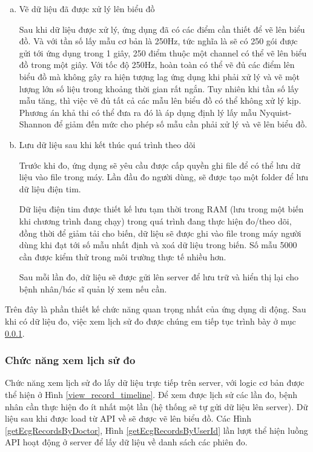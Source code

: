 \begin{enumerate} [a)]
  \item Vẽ dữ liệu đã được xử lý lên biểu đồ

    Sau khi dữ liệu được xử lý, ứng dụng đã có các điểm cần thiết để vẽ lên biểu đồ. Và với tần số lấy mẫu cơ bản là 250Hz, 
    tức nghĩa là sẽ có 250 gói được gửi tới ứng dụng trong 1 giây, 250 điểm thuộc một channel có thể vẽ lên biểu đồ trong một giây.
    Với tốc độ 250Hz, hoàn toàn có thể vẽ đủ các điểm lên biểu đồ mà không gây ra hiện tượng lag ứng dụng khi phải xử lý và vẽ một
    lượng lớn số liệu trong khoảng thời gian rất ngắn. Tuy nhiên khi tần số lấy mẫu tăng, thì việc vẽ đủ tất cả các mẫu lên
    biểu đồ có thể không xử lý kịp. Phương án khả thi có thể đưa ra đó là áp dụng định lý lấy mẫu Nyquist-Shannon để giảm
    đến mức cho phép số mẫu cần phải xử lý và vẽ lên biểu đồ.

  \item Lưu dữ liệu sau khi kết thúc quá trình theo dõi
    
    Trước khi đo, ứng dụng sẽ yêu cầu được cấp quyền ghi file để có thể lưu dữ liệu vào file trong máy. Lần đầu đo người dùng,
    sẽ được tạo một folder để lưu dữ liệu điện tim.
  
    Dữ liệu điện tim được thiết kế lưu tạm thời trong RAM (lưu trong một biến khi chương trình đang chạy) trong quá trình 
    đang thực hiện đo/theo dõi, đồng thời để giảm tải cho biến, dữ liệu sẽ được ghi vào file trong máy người dùng khi đạt tới số mẫu nhất định và xoá dữ liệu trong biến.
    Số mẫu 5000 cần được kiểm thử trong môi trường thực tế nhiều hơn.

    Sau mỗi lần đo, dữ liệu sẽ được gửi lên server để lưu trữ và hiển thị lại cho bệnh nhân/bác sĩ quản lý xem nếu cần.

\end{enumerate}
Trên đây là phần thiết kế chức năng quan trọng nhất của ứng dụng di động. Sau khi có dữ liệu đo, việc xem lịch sử đo được chúng em 
tiếp tục trình bày ở mục \ref{function_view_history_record}.

\subsubsection{Chức năng xem lịch sử đo}
\label{function_view_history_record}


Chức năng xem lịch sử đo lấy dữ liệu trực tiếp trên server, với logic cơ bản được thể hiện ở Hình \ref{view_record_timeline}. 
Để xem được lịch sử các lần đo, bệnh nhân cần thực hiện đo ít nhất một lần (hệ thống sẽ tự gửi dữ liệu lên server). Dữ liệu sau khi được
load từ API về sẽ được vẽ lên biểu đồ. Các Hình \ref{getEcgRecordsByDoctor}, Hình \ref{getEcgRecordsByUserId}
lần lượt thể hiện luồng API hoạt động ở server để lấy dữ liệu về danh sách các phiên đo. 

